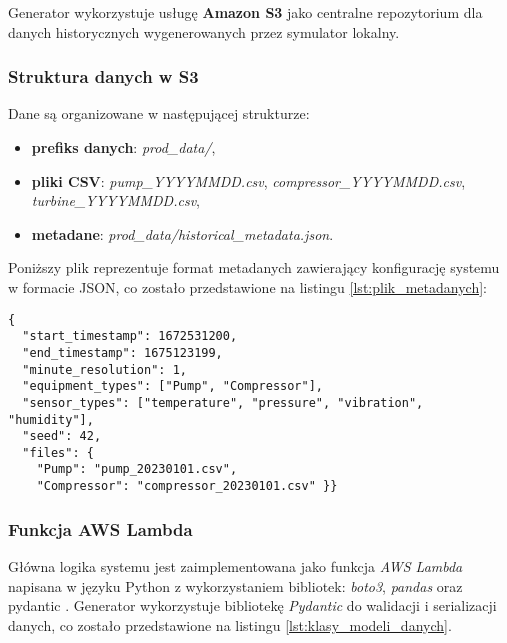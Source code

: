 Generator wykorzystuje usługę \textbf{Amazon S3} jako centralne repozytorium dla danych historycznych wygenerowanych przez symulator lokalny.

\subsubsection{Struktura danych w S3}

Dane są organizowane w następującej strukturze:

\begin{itemize}
    \item \textbf{prefiks danych}: \textit{prod\_data/},
    \item \textbf{pliki CSV}: \textit{pump\_YYYYMMDD.csv}, \textit{compressor\_YYYYMMDD.csv}, \\ \textit{turbine\_YYYYMMDD.csv},
    \item \textbf{metadane}: \textit{prod\_data/historical\_metadata.json}.
\end{itemize}

\vspace{0.3em}

Poniższy plik reprezentuje format metadanych zawierający konfigurację systemu w formacie JSON, co zostało przedstawione na listingu \ref{lst:plik_metadanych}:

\begin{lstlisting}[caption=Przykładowy plik metadanych, label={lst:plik_metadanych}]
{
  "start_timestamp": 1672531200,
  "end_timestamp": 1675123199,
  "minute_resolution": 1,
  "equipment_types": ["Pump", "Compressor"],
  "sensor_types": ["temperature", "pressure", "vibration", "humidity"],
  "seed": 42,
  "files": {
    "Pump": "pump_20230101.csv",
    "Compressor": "compressor_20230101.csv" }}
\end{lstlisting}

\newpage

\subsubsection{Funkcja AWS Lambda}
\label{subsec:aws_lambda}

Główna logika systemu jest zaimplementowana jako funkcja \textit{AWS Lambda} napisana w języku Python z wykorzystaniem bibliotek: \textit{boto3}, \textit{pandas} oraz pydantic \cite{pydantic_docs}. Generator wykorzystuje bibliotekę \textit{Pydantic} do walidacji i serializacji danych, co zostało przedstawione na listingu \ref{lst:klasy_modeli_danych}.

